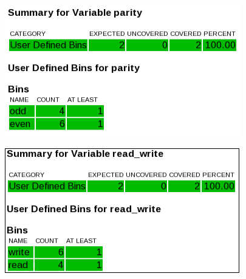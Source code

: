 \begin{figure}[h!]
\centering
\includegraphics{./figures/urgreport5.png}
\label{fig:urgreport5.png}
\end{figure}

\begin{figure}[h!]
\centering
\includegraphics{./figures/urgreport6.png}
\label{fig:urgreport6.png}
\end{figure}
